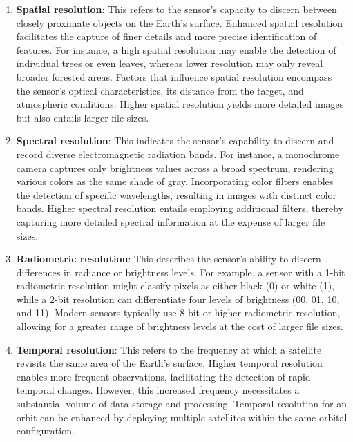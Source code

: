 \documentclass[
  12 pt,
]{Nemilov}
\begin{document}
\begin{enumerate}
\def\labelenumi{\arabic{enumi}.}
\item
  \textbf{Spatial resolution}: This refers to the sensor's capacity to discern between closely proximate objects on the Earth's surface. Enhanced spatial resolution facilitates the capture of finer details and more precise identification of features. For instance, a high spatial resolution may enable the detection of individual trees or even leaves, whereas lower resolution may only reveal broader forested areas. Factors that influence spatial resolution encompass the sensor's optical characteristics, its distance from the target, and atmospheric conditions. Higher spatial resolution yields more detailed images but also entails larger file sizes.
\item
  \textbf{Spectral resolution}: This indicates the sensor's capability to discern and record diverse electromagnetic radiation bands. For instance, a monochrome camera captures only brightness values across a broad spectrum, rendering various colors as the same shade of gray. Incorporating color filters enables the detection of specific wavelengths, resulting in images with distinct color bands. Higher spectral resolution entails employing additional filters, thereby capturing more detailed spectral information at the expense of larger file sizes.
\item
  \textbf{Radiometric resolution}: This describes the sensor's ability to discern differences in radiance or brightness levels. For example, a sensor with a 1-bit radiometric resolution might classify pixels as either black (0) or white (1), while a 2-bit resolution can differentiate four levels of brightness (00, 01, 10, and 11). Modern sensors typically use 8-bit or higher radiometric resolution, allowing for a greater range of brightness levels at the cost of larger file sizes.
\item
  \textbf{Temporal resolution}: This refers to the frequency at which a satellite revisits the same area of the Earth's surface. Higher temporal resolution enables more frequent observations, facilitating the detection of rapid temporal changes. However, this increased frequency necessitates a substantial volume of data storage and processing. Temporal resolution for an orbit can be enhanced by deploying multiple satellites within the same orbital configuration.
\end{enumerate}
\end{document}
